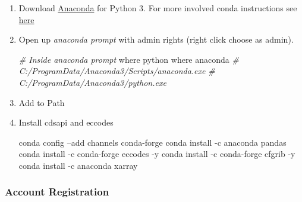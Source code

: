 \documentclass[
]{book}
\newenvironment{Shaded}{\begin{snugshade}}{\end{snugshade}}
\newcommand{\CommentTok}[1]{\textcolor[rgb]{0.56,0.35,0.01}{\textit{#1}}}
\newcommand{\ExtensionTok}[1]{#1}
\newcommand{\NormalTok}[1]{#1}
\begin{document}
\begin{enumerate}
\def\labelenumi{\arabic{enumi}.}
\item
  Download \href{https://www.anaconda.com/products/individual}{Anaconda} for Python 3. For more involved conda instructions see \href{https://fanwangecon.github.io/Tex4Econ/nontex/install/windows/fn_installations.html}{here}
\item
  Open up \emph{anaconda prompt} with admin rights (right click choose as admin).

\begin{Shaded}
\begin{Highlighting}[]
\CommentTok{# Inside anaconda prompt}
\ExtensionTok{where}\NormalTok{ python}
\ExtensionTok{where}\NormalTok{ anaconda}
\CommentTok{# C:/ProgramData/Anaconda3/Scripts/anaconda.exe}
\CommentTok{# C:/ProgramData/Anaconda3/python.exe}
\end{Highlighting}
\end{Shaded}
\item
  Add to Path
\item
  Install cdsapi and eccodes

\begin{Shaded}
\begin{Highlighting}[]
\ExtensionTok{conda}\NormalTok{ config --add channels conda-forge}
\ExtensionTok{conda}\NormalTok{ install -c anaconda pandas}
\ExtensionTok{conda}\NormalTok{ install -c conda-forge eccodes -y}
\ExtensionTok{conda}\NormalTok{ install -c conda-forge cfgrib -y}
\ExtensionTok{conda}\NormalTok{ install -c anaconda xarray}
\end{Highlighting}
\end{Shaded}
\end{enumerate}

\hypertarget{account-registration}{%
\subsubsection{Account Registration}\label{account-registration}}
\end{document}
